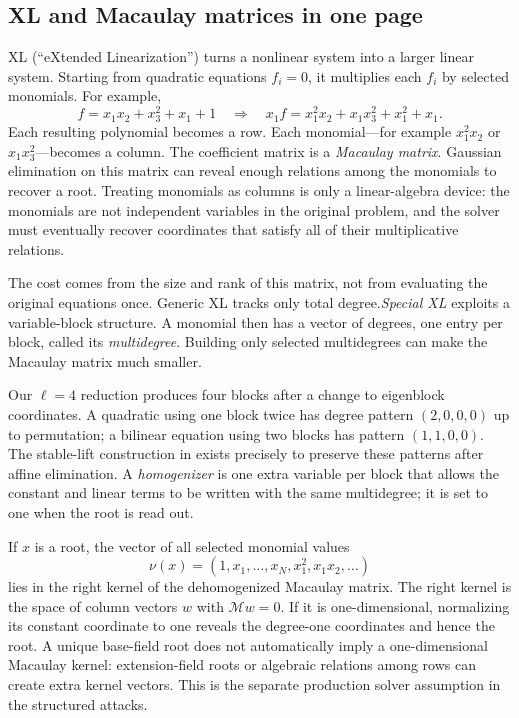 \documentclass[11pt]{article}
\begin{document}
\subsection{XL and Macaulay matrices in one page}\label{sec:xl-primer}

XL (``eXtended Linearization'') turns a nonlinear system into a larger linear
system.  Starting from quadratic equations $f_i=0$, it multiplies each $f_i$
by selected monomials.  For example,
\[
  f=x_1x_2+x_3^2+x_1+1
  \quad\Longrightarrow\quad
  x_1f=x_1^2x_2+x_1x_3^2+x_1^2+x_1.
\]
Each resulting polynomial becomes a row.  Each monomial---for example
$x_1^2x_2$ or $x_1x_3^2$---becomes a column.  The coefficient matrix is a
\emph{Macaulay matrix}.  Gaussian elimination on this matrix can reveal enough
relations among the monomials to recover a root.  Treating monomials as columns
is only a linear-algebra device: the monomials are not independent variables in
the original problem, and the solver must eventually recover coordinates that
satisfy all of their multiplicative relations.

The cost comes from the size and rank of this matrix, not from evaluating the
original equations once.  Generic XL tracks only total degree.\@  \emph{Special
XL} exploits a variable-block structure.  A monomial then has a vector of
degrees, one entry per block, called its \emph{multidegree}.  Building only
selected multidegrees can make the Macaulay matrix much smaller.

Our $\ell=4$ reduction produces four blocks after a change to eigenblock
coordinates.  A quadratic using one block twice has degree pattern
$(2,0,0,0)$ up to permutation; a bilinear equation using two blocks has pattern
$(1,1,0,0)$.  The stable-lift construction in
 exists precisely to preserve these patterns after
affine elimination.  A \emph{homogenizer} is one extra variable per block that
allows the constant and linear terms to be written with the same
multidegree; it is set to one when the root is read out.

If $x$ is a root, the vector of all selected monomial values
\[
  \nu(x)=(1,x_1,\ldots,x_N,x_1^2,x_1x_2,\ldots)
\]
lies in the right kernel of the dehomogenized Macaulay matrix.  The right
kernel is the space of column vectors $w$ with $\mathcal M w=0$.  If it is
one-dimensional, normalizing its constant coordinate to one reveals the
degree-one coordinates and hence the root.  A unique base-field root does
not automatically imply a one-dimensional Macaulay kernel: extension-field
roots or algebraic relations among rows can create extra kernel vectors.  This
is the separate production solver assumption in the structured attacks.
\end{document}
